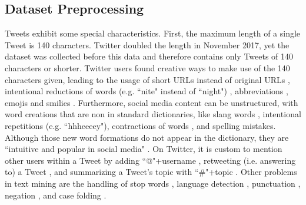 \subsection{Dataset Preprocessing}
Tweets exhibit some special characteristics. First, the maximum length of a single Tweet is 140 characters. Twitter doubled the length in November 2017, yet the dataset was collected before this data and therefore contains only Tweets of 140 characters or shorter. Twitter users found creative ways to make use of the 140 characters given, leading to the usage of short URLs instead of original URLs \cite{xiang2012detecting}, intentional reductions of words (e.g. ``nite" instead of ``night") \cite{xiang2012detecting}, abbreviations \cite{gupta2018proposed}, emojis \cite{ghorai2016information} \cite{watanabe2018hate} and smilies \cite{smailovic2013predictive} \cite{hovelmann2017fasttext}.\newline
Furthermore, social media content can be unstructured, with word creations that are non in standard dictionaries, like slang words \cite{gupta2018proposed} \cite{watanabe2018hate}, intentional repetitions \cite{xiang2012detecting} \cite{hemalatha2012preprocessing} \cite{montani2018tuwienkbs} \cite{rother2018ulmfit} (e.g. ``hhheeeey"), contractions of words \cite{smailovic2013predictive} \cite{hemalatha2012preprocessing}, and spelling mistakes. Although those new word formations do not appear in the dictionary, they are ``intuitive and popular in social media" \cite{hu2012text}. \newline
On Twitter, it is custom to mention other users within a Tweet by adding ``@"+username \cite{xiang2012detecting} \cite{montani2018tuwienkbs} \cite{watanabe2018hate} \cite{rother2018ulmfit}, retweeting (i.e. answering to) a Tweet \cite{xiang2012detecting} \cite{hemalatha2012preprocessing}, and summarizing a Tweet's topic with ``\#"+topic \cite{xiang2012detecting} \cite{watanabe2018hate}. \newline
Other problems in text mining are the handling of stop words \cite{xiang2012detecting} \cite{ghorai2016information} \cite{gupta2018proposed}, language detection \cite{xiang2012detecting}, punctuation \cite{ghorai2016information} \cite{hemalatha2012preprocessing} \cite{montani2018tuwienkbs}, negation \cite{watanabe2018hate}, and case folding \cite{ghorai2016information} \cite{gupta2018proposed} \cite{rother2018ulmfit}.\newline
